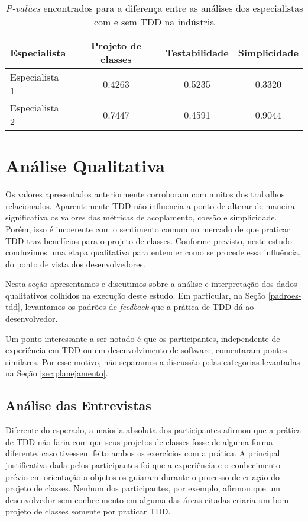 \documentclass[conference]{IEEEtran}
\begin{document}
\begin{table}[h!]
	\centering
	\begin{tabular}{| p{2cm} | c | c | c | }
		\hline
		\textbf{Especialista} & \textbf{Projeto de classes} & \textbf{Testabilidade} & \textbf{Simplicidade}\\
		\hline
		Especialista 1 &	0.4263 &	0.5235 &	0.3320\\
		Especialista 2 &	0.7447 &	0.4591 &	0.9044\\
		\hline
	\end{tabular}
	\caption{\textit{P-values} encontrados para a diferença entre as análises dos especialistas com e sem TDD na indústria}
	\label{tab:especialistas-industria}
\end{table}

\section{Análise Qualitativa}

Os valores apresentados anteriormente corroboram com muitos dos trabalhos relacionados. 
Aparentemente TDD não influencia a ponto de alterar 
de maneira significativa os valores das métricas de acoplamento, coesão e simplicidade.
Porém, isso é incoerente com o sentimento comum no mercado de que praticar TDD
traz benefícios para o projeto de classes. Conforme previsto, neste estudo conduzimos
uma etapa qualitativa para entender como se procede essa influência, do ponto
de vista dos desenvolvedores.

Nesta seção apresentamos e discutimos sobre a análise e interpretação dos dados qualitativos colhidos
na execução deste estudo. Em particular, na Seção 
\ref{padroes-tdd}, levantamos os padrões de \textit{feedback} que a prática de TDD
dá ao desenvolvedor.

Um ponto interessante a ser notado é que os participantes, independente de experiência
em TDD ou em desenvolvimento de software, comentaram pontos similares. Por esse motivo,
não separamos a discussão pelas categorias levantadas na Seção \ref{sec:planejamento}.

\subsection{Análise das Entrevistas}

Diferente do esperado, a maioria absoluta dos participantes afirmou que 
a prática de TDD não faria com que seus projetos de classes fosse de alguma forma diferente, 
caso tivessem feito ambos os exercícios com a prática.
A principal justificativa dada pelos participantes foi que a experiência e o conhecimento prévio
em orientação a objetos os guiaram durante o processo de criação do projeto de classes. Nenhum dos
participantes, por exemplo, afirmou que um desenvolvedor sem conhecimento em alguma das áreas
citadas criaria um bom projeto de classes somente por praticar TDD.
\end{document}
